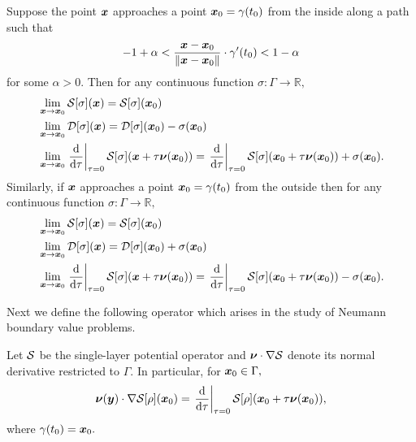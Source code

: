 \begin{theorem}\label{thm:potlim}
Suppose the point $\boldsymbol{x}$ approaches a point $\boldsymbol{x}_0 = \gamma(t_0)$ from the inside along a path such that 
\begin{align}
-1+\alpha<\frac{\boldsymbol{x}-\boldsymbol{x}_0}{\|\boldsymbol{x}-\boldsymbol{x}_0\|} \cdot \gamma'(t_0) <1-\alpha
\end{align}
for some $\alpha >0.$ Then {\color{red}for any continuous function $\sigma:\Gamma \to \mathbb{R},$}
\begin{align}
&\lim_{\boldsymbol{x} \to \boldsymbol{x}_0} \mathcal{S}[\sigma](\boldsymbol{x}) = \mathcal{S}[\sigma](\boldsymbol{x}_0)\\
&\lim_{\boldsymbol{x} \to \boldsymbol{x}_0} \mathcal{D}[\sigma](\boldsymbol{x}) = \mathcal{D}[\sigma](\boldsymbol{x}_0)- \sigma(\boldsymbol{x}_0)\\
&\lim_{\boldsymbol{x} \to \boldsymbol{x}_0} \left.\frac{{\rm d}}{{\rm d}\tau}\right|_{\tau= 0}\mathcal{S}[\sigma](\boldsymbol{x}+\tau \boldsymbol{\nu}(\boldsymbol{x}_0)) = \left.\frac{{\rm d}}{{\rm d}\tau}\right|_{\tau= 0}\mathcal{S}[\sigma](\boldsymbol{x}_0+\tau \boldsymbol{\nu}(\boldsymbol{x}_0))+ \sigma(\boldsymbol{x}_0).
\end{align}
Similarly, if $\boldsymbol{x}$ approaches a point $\boldsymbol{x}_0 = \gamma(t_0)$ from the outside then for any continuous function $\sigma:\Gamma \to \mathbb{R},$
\begin{align}
&\lim_{\boldsymbol{x} \to \boldsymbol{x}_0} \mathcal{S}[\sigma](\boldsymbol{x}) = \mathcal{S}[\sigma](\boldsymbol{x}_0)\\
&\lim_{\boldsymbol{x} \to \boldsymbol{x}_0} \mathcal{D}[\sigma](\boldsymbol{x}) = \mathcal{D}[\sigma](\boldsymbol{x}_0)+ \sigma(\boldsymbol{x}_0)\\
&\lim_{\boldsymbol{x} \to \boldsymbol{x}_0} \left.\frac{{\rm d}}{{\rm d}\tau}\right|_{\tau= 0}\mathcal{S}[\sigma](\boldsymbol{x}+\tau \boldsymbol{\nu}(\boldsymbol{x}_0)) = \left.\frac{{\rm d}}{{\rm d}\tau}\right|_{\tau= 0}\mathcal{S}[\sigma](\boldsymbol{x}_0+\tau \boldsymbol{\nu}(\boldsymbol{x}_0))- \sigma(\boldsymbol{x}_0).
\end{align}
\end{theorem}

Next we define the following operator which arises in the study of Neumann boundary value problems.
\begin{definition}\label{def_singder}
Let $\mathcal{S}$ be the single-layer potential operator and $\boldsymbol{\nu}\cdot \nabla \mathcal{S}$  denote its normal derivative restricted to $\Gamma.$ In particular, for $\boldsymbol{x}_0 \in \Gamma,$
\begin{align}
\boldsymbol{\nu}(\boldsymbol{y})\cdot \nabla \mathcal{S}[\rho] (\boldsymbol{x}_0) = \left.\frac{{\rm d}}{{\rm d}\tau}\right|_{\tau = 0} \mathcal{S}[\rho](\boldsymbol{x}_0 + \tau \boldsymbol{\nu}(\boldsymbol{x}_0)),
\end{align}
where $\gamma(t_0) = \boldsymbol{x}_0.$
\end{definition}

